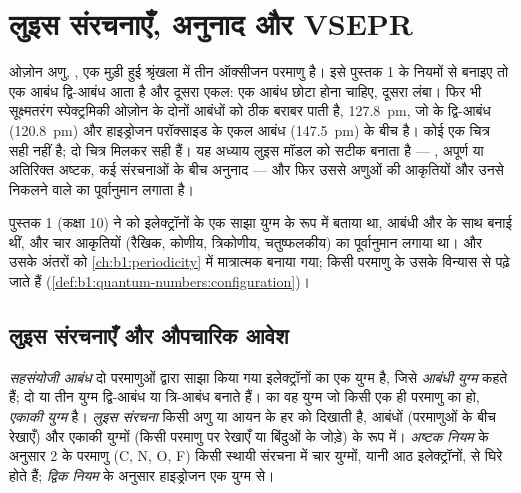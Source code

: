 \chapter{लुइस संरचनाएँ, अनुनाद और VSEPR}\label{ch:b1:lewis-resonance-vsepr}

ओज़ोन अणु, , एक मुड़ी हुई श्रृंखला में तीन ऑक्सीजन परमाणु है। इसे
पुस्तक 1 के नियमों से बनाइए तो एक आबंध द्वि-आबंध आता है और दूसरा
एकल: एक आबंध छोटा होना चाहिए, दूसरा लंबा। फिर भी सूक्ष्मतरंग
स्पेक्ट्रमिकी ओज़ोन के दोनों  आबंधों को ठीक बराबर पाती है,
\qty{127.8}{pm}, जो  के द्वि-आबंध (\qty{120.8}{pm}) और
हाइड्रोजन परॉक्साइड के एकल आबंध (\qty{147.5}{pm}) के बीच है। कोई एक चित्र
सही नहीं है; दो चित्र मिलकर सही हैं। यह अध्याय लुइस मॉडल को
सटीक बनाता है --- , अपूर्ण या अतिरिक्त अष्टक,
कई संरचनाओं के बीच अनुनाद --- और फिर उससे अणुओं की आकृतियों और उनसे
निकलने वाले  का पूर्वानुमान लगाता है।

\begin{recall}
पुस्तक 1 (कक्षा 10) ने  को इलेक्ट्रॉनों के एक साझा युग्म के रूप में
बताया था, आबंधी और  के साथ  बनाई थीं, और
चार आकृतियों (रैखिक, कोणीय, त्रिकोणीय, चतुष्फलकीय) का पूर्वानुमान लगाया था।
 और उसके अंतरों को \cref{ch:b1:periodicity} में मात्रात्मक
बनाया गया; किसी परमाणु के 
उसके विन्यास से पढ़े जाते हैं (\cref{def:b1:quantum-numbers:configuration})।
\end{recall}

\section{लुइस संरचनाएँ और औपचारिक आवेश}

\begin{definition}\label{def:b1:lewis-resonance-vsepr:lewis}
\emph{सहसंयोजी आबंध} दो परमाणुओं द्वारा साझा किया गया
इलेक्ट्रॉनों का एक युग्म है, जिसे \emph{आबंधी युग्म} कहते हैं; दो या तीन
युग्म द्वि-आबंध या त्रि-आबंध बनाते हैं।  का वह युग्म जो
किसी एक ही परमाणु का हो, \emph{एकाकी युग्म} है।
\emph{लुइस संरचना} किसी अणु या आयन के हर  को दिखाती है, आबंधों (परमाणुओं के बीच रेखाएँ) और एकाकी
युग्मों (किसी परमाणु पर रेखाएँ या बिंदुओं के जोड़े) के रूप में। \emph{अष्टक
नियम} के अनुसार  2 के परमाणु (C, N, O, F) किसी
स्थायी संरचना में चार युग्मों, यानी आठ इलेक्ट्रॉनों, से घिरे होते हैं;
\emph{द्विक नियम} के अनुसार हाइड्रोजन एक युग्म से।
\end{definition}


